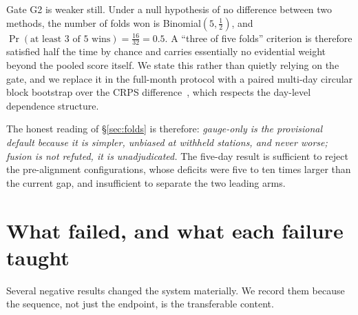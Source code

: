 \documentclass[10pt,twocolumn]{article}
\begin{document}
Gate G2 is weaker still. Under a null hypothesis of no difference between two
methods, the number of folds won is Binomial$(5,\tfrac12)$, and
$\Pr(\text{at least 3 of 5 wins})=\tfrac{16}{32}=0.5$. A ``three of five
folds'' criterion is therefore satisfied half the time by chance and carries
essentially no evidential weight beyond the pooled score itself. We state this
rather than quietly relying on the gate, and we replace it in the full-month
protocol with a paired multi-day circular block bootstrap over the CRPS
difference~\cite{politis1994}, which respects the day-level dependence
structure.

The honest reading of \S\ref{sec:folds} is therefore: \emph{gauge-only is the
provisional default because it is simpler, unbiased at withheld stations, and
never worse; fusion is not refuted, it is unadjudicated.} The five-day result
is sufficient to reject the pre-alignment configurations, whose deficits were
five to ten times larger than the current gap, and insufficient to separate the
two leading arms.

\section{What failed, and what each failure taught}

Several negative results changed the system materially. We record them because
the sequence, not just the endpoint, is the transferable content.
\end{document}
